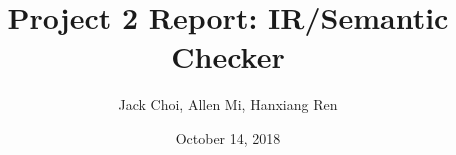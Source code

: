 \title{Project 2 Report: IR/Semantic Checker}
\author{Jack Choi, Allen Mi, Hanxiang Ren}
\date{October 14, 2018}
\newcommand{\reportfile}{scalars_report_2.tex}
